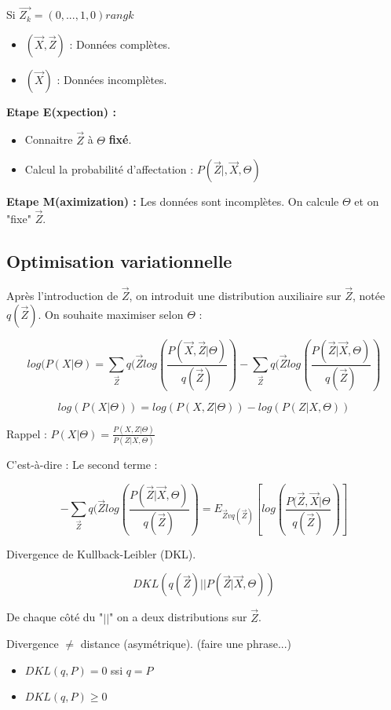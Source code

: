 \documentclass{article}
\begin{document}
Si $\vec{Z_k} = (0, ..., 1, 0) rang k$
\begin{itemize}
\item $(\vec{X}, \vec{Z})$ : Données complètes.
\item $(\vec{X})$ : Données incomplètes.
\end{itemize}

\textbf{Etape E(xpection) : }
\begin{itemize}
\item Connaitre $\vec{Z}$ à $\Theta$ \textbf{fixé}.
\item Calcul la probabilité d'affectation : $P(\vec{Z} |, \vec{X}, \Theta)$
\end{itemize}

\textbf{Etape M(aximization) :} Les données sont incomplètes. On calcule $\Theta$ et on "fixe" $\vec{Z}$.

\subsection{Optimisation variationnelle}

Après l'introduction de $\vec{Z}$, on introduit une distribution auxiliaire sur $\vec{Z}$, notée $q(\vec{Z})$. On souhaite maximiser selon $\Theta$ : 

\[ log(P(X | \Theta) = \sum_{\vec{Z}} q(\vec{Z} log(\frac{P(\vec{X}, \vec{Z} | \Theta)}{q(\vec{Z})} ) - \sum_{\vec{Z}} q(\vec{Z} log(\frac{P(\vec{Z} | \vec{X}, \Theta)}{q(\vec{Z})} ) \]

\[ log(P(X | \Theta)) = log(P(X, Z | \Theta)) - log(P(Z | X, \Theta)) \]

Rappel : $P(X | \Theta) = \frac{P(X, Z | \Theta)}{P(Z | X, \Theta)}$

C'est-à-dire : Le second terme : 

\[ - \sum_{\vec{Z}} q(\vec{Z} log(\frac{P(\vec{Z} | \vec{X}, \Theta)}{q(\vec{Z})} ) = E_{\vec{Z}vq(\vec{Z})} [log(\frac{P(\vec{Z}, \vec{X} | \Theta}{q(\vec{Z})})]  \]

Divergence de Kullback-Leibler (DKL).

\[ DKL(q(\vec{Z}) || P(\vec{Z} | \vec{X}, \Theta)) \]

De chaque côté du "$||$" on a deux distributions sur $\vec{Z}$.

Divergence $\ne$ distance (asymétrique). (faire une phrase...)
\begin{itemize}
\item $DKL(q, P) = 0$ ssi $q = P$
\item $DKL(q, P) \geq 0$ 
\end{itemize}
\end{document}
